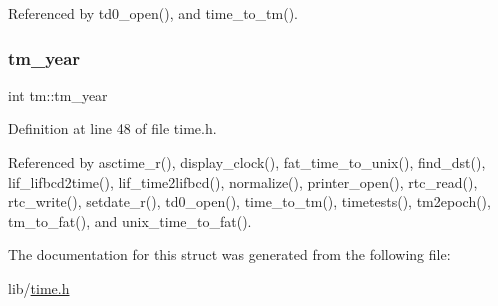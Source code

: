 Referenced by td0\+\_\+open(), and time\+\_\+to\+\_\+tm().

\mbox{\label{structtm_a33adf78fd6476b2120ce3b9c4a852053}} 
\subsubsection{\texorpdfstring{tm\+\_\+year}{tm\_year}}
{\footnotesize\ttfamily int tm\+::tm\+\_\+year}



Definition at line 48 of file time.\+h.



Referenced by asctime\+\_\+r(), display\+\_\+clock(), fat\+\_\+time\+\_\+to\+\_\+unix(), find\+\_\+dst(), lif\+\_\+lifbcd2time(), lif\+\_\+time2lifbcd(), normalize(), printer\+\_\+open(), rtc\+\_\+read(), rtc\+\_\+write(), setdate\+\_\+r(), td0\+\_\+open(), time\+\_\+to\+\_\+tm(), timetests(), tm2epoch(), tm\+\_\+to\+\_\+fat(), and unix\+\_\+time\+\_\+to\+\_\+fat().



The documentation for this struct was generated from the following file\+:\begin{DoxyCompactItemize}
\item 
lib/\hyperlink{time_8h}{time.\+h}\end{DoxyCompactItemize}
